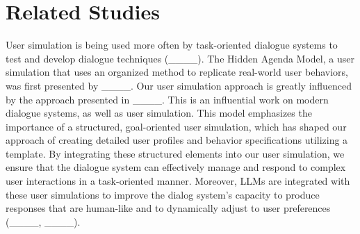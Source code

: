 \section{Related Studies}
User simulation is being used more often by task-oriented dialogue systems to test and develop dialogue techniques (____). The Hidden Agenda Model, a user simulation that uses an organized method to replicate real-world user behaviors, was first presented by ____. Our user simulation approach is greatly influenced by the approach presented in ____. This is an influential work on modern dialogue systems, as well as user simulation. This model emphasizes the importance of a structured, goal-oriented user simulation, which has shaped our approach of creating detailed user profiles and behavior specifications utilizing a template. By integrating these structured elements into our user simulation, we ensure that the dialogue system can effectively manage and respond to complex user interactions in a task-oriented manner. Moreover, LLMs are integrated with these user simulations to improve the dialog system's capacity to produce responses that are human-like and to dynamically adjust to user preferences (____, ____).